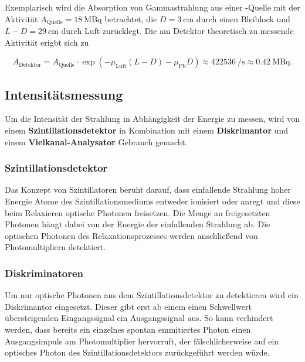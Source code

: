         Exemplarisch wird die Absorption von Gammastrahlung aus einer -Quelle mit der Aktivität $A_{\text{Quelle}} = \SI{18}{\mega\becquerel}$ betrachtet, die $D=\SI{3}{\centi\metre}$ durch einen 
        Bleiblock und $L-D = \SI{29}{\centi\metre}$ durch Luft zurücklegt. Die am Detektor theoretisch zu messende Aktivität erigbt sich zu

        \begin{equation*}
          A_{\text{Detektor}} = A_{\text{Quelle}} \cdot \exp\left(-\mu_{\text{Luft}}\left(L-D\right) - \mu_{\text{Pb}}D\right) \approx \SI{422536}{\per\second} \approx \SI{0.42}{\mega\becquerel}.
        \end{equation*}
    
        \FloatBarrier

      \newpage
      \subsection{Intensitätsmessung}
        Um die Intensität der Strahlung in Abhängigkeit der Energie zu messen, wird von einem \textbf{Szintillationsdetektor} in Kombination mit einem \textbf{Diskrimantor} und einem 
        \textbf{Vielkanal-Analysator} Gebrauch gemacht.

        \subsubsection*{Szintillationsdetektor}
          Das Konzept von Szintillatoren beruht darauf, dass einfallende Strahlung hoher Energie Atome des Szintillationsmediums entweder ionisiert oder anregt und 
          diese beim Relaxieren optische Photonen freisetzen. Die Menge an freigesetzten Photonen hängt dabei von der Energie der einfallenden Strahlung ab. Die optischen Photonen des Relaxationsprozesses 
          werden anschließend von Photomultipliern detektiert. %
        \newpage
        \subsubsection*{Diskriminatoren}
          Um nur optische Photonen aus dem Szintillationsdetektor zu detektieren wird ein Diskrimantor eingesetzt. Dieser gibt erst ab einem einen Schwellwert übersteigenden Eingangssignal ein Ausgangssignal 
          aus. So kann verhindert werden, dass bereits ein einzelnes spontan emmitiertes Photon einen Ausgangsimpuls am Photomultiplier hervorruft, der fälschlicherweise auf ein optisches Photon des 
          Szintillationsdetektors zurückgeführt werden würde.

